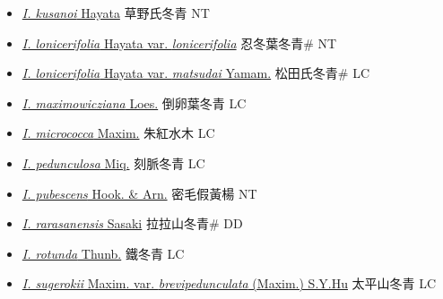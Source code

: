 \begin{itemize}
\begin{itemize}
        \item[] \href{http://www.theplantlist.org/tpl1.1/search?q=Ilex+kusanoi}{\textit{I. kusanoi} Hayata}   草野氏冬青 NT
        \item[] \href{http://www.theplantlist.org/tpl1.1/search?q=Ilex+lonicerifolia+var.+lonicerifolia}{\textit{I. lonicerifolia} Hayata var. \textit{lonicerifolia}}   忍冬葉冬青\# NT
        \item[] \href{http://www.theplantlist.org/tpl1.1/search?q=Ilex+lonicerifolia+var.+matsudai}{\textit{I. lonicerifolia} Hayata var. \textit{matsudai} Yamam.}   松田氏冬青\# LC
        \item[] \href{http://www.theplantlist.org/tpl1.1/search?q=Ilex+maximowicziana}{\textit{I. maximowicziana} Loes.}   倒卵葉冬青 LC
        \item[] \href{http://www.theplantlist.org/tpl1.1/search?q=Ilex+micrococca}{\textit{I. micrococca} Maxim.}   朱紅水木 LC
        \item[] \href{http://www.theplantlist.org/tpl1.1/search?q=Ilex+pedunculosa}{\textit{I. pedunculosa} Miq.}   刻脈冬青 LC
        \item[] \href{http://www.theplantlist.org/tpl1.1/search?q=Ilex+pubescens}{\textit{I. pubescens} Hook. \& Arn.}   密毛假黃楊 NT
        \item[] \href{http://www.theplantlist.org/tpl1.1/search?q=Ilex+rarasanensis}{\textit{I. rarasanensis} Sasaki}   拉拉山冬青\# DD
        \item[] \href{http://www.theplantlist.org/tpl1.1/search?q=Ilex+rotunda}{\textit{I. rotunda} Thunb.}   鐵冬青 LC
        \item[] \href{http://www.theplantlist.org/tpl1.1/search?q=Ilex+sugerokii+var.+brevipedunculata}{\textit{I. sugerokii} Maxim. var. \textit{brevipedunculata} (Maxim.) S.Y.Hu}   太平山冬青 LC

\end{itemize}
\end{itemize}
